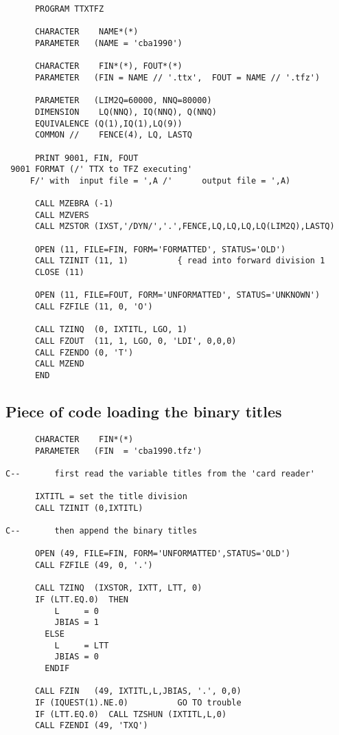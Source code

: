 \begin{verbatim}
      PROGRAM TTXTFZ

      CHARACTER    NAME*(*)
      PARAMETER   (NAME = 'cba1990')

      CHARACTER    FIN*(*), FOUT*(*)
      PARAMETER   (FIN = NAME // '.ttx',  FOUT = NAME // '.tfz')

      PARAMETER   (LIM2Q=60000, NNQ=80000)
      DIMENSION    LQ(NNQ), IQ(NNQ), Q(NNQ)
      EQUIVALENCE (Q(1),IQ(1),LQ(9))
      COMMON //    FENCE(4), LQ, LASTQ

      PRINT 9001, FIN, FOUT
 9001 FORMAT (/' TTX to TFZ executing'
     F/' with  input file = ',A /'      output file = ',A)

      CALL MZEBRA (-1)
      CALL MZVERS
      CALL MZSTOR (IXST,'/DYN/','.',FENCE,LQ,LQ,LQ,LQ(LIM2Q),LASTQ)

      OPEN (11, FILE=FIN, FORM='FORMATTED', STATUS='OLD')
      CALL TZINIT (11, 1)          { read into forward division 1
      CLOSE (11)

      OPEN (11, FILE=FOUT, FORM='UNFORMATTED', STATUS='UNKNOWN')
      CALL FZFILE (11, 0, 'O')

      CALL TZINQ  (0, IXTITL, LGO, 1)
      CALL FZOUT  (11, 1, LGO, 0, 'LDI', 0,0,0)
      CALL FZENDO (0, 'T')
      CALL MZEND
      END
\end{verbatim}

\subsection*{Piece of code loading the binary titles}

\begin{verbatim}
      CHARACTER    FIN*(*)
      PARAMETER   (FIN  = 'cba1990.tfz')

C--       first read the variable titles from the 'card reader'

      IXTITL = set the title division
      CALL TZINIT (0,IXTITL)

C--       then append the binary titles

      OPEN (49, FILE=FIN, FORM='UNFORMATTED',STATUS='OLD')
      CALL FZFILE (49, 0, '.')

      CALL TZINQ  (IXSTOR, IXTT, LTT, 0)
      IF (LTT.EQ.0)  THEN
          L     = 0
          JBIAS = 1
        ELSE
          L     = LTT
          JBIAS = 0
        ENDIF

      CALL FZIN   (49, IXTITL,L,JBIAS, '.', 0,0)
      IF (IQUEST(1).NE.0)          GO TO trouble
      IF (LTT.EQ.0)  CALL TZSHUN (IXTITL,L,0)
      CALL FZENDI (49, 'TXQ')
\end{verbatim}

